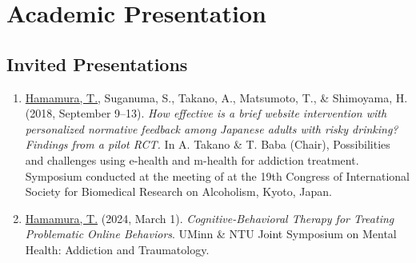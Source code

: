 \documentclass[a4paper]{article}
\begin{document}
\section{Academic Presentation}
\subsection{Invited Presentations}
\begin{enumerate}
	\item \underline{Hamamura, T.}, Suganuma, S., Takano, A., Matsumoto, T., \& Shimoyama, H. (2018, September 9--13). \textit{How effective is a brief website intervention with personalized normative feedback among Japanese adults with risky drinking? Findings from a pilot RCT.} In A. Takano \& T. Baba (Chair), Possibilities and challenges using e-health and m-health for addiction treatment. Symposium conducted at the meeting of at the 19th Congress of International Society for Biomedical Research on Alcoholism, Kyoto, Japan.
	\item \underline{Hamamura, T.} (2024, March 1). \textit{Cognitive-Behavioral Therapy for Treating Problematic Online Behaviors}. UMinn \& NTU Joint Symposium on Mental Health: Addiction and Traumatology.
\end{enumerate}
\end{document}
